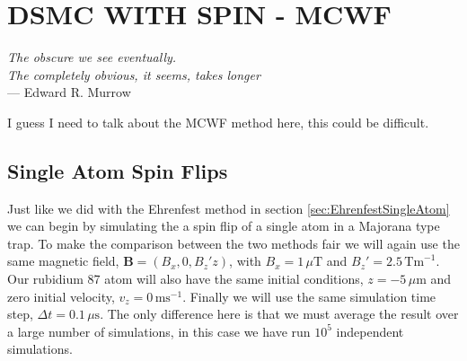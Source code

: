 
\chapter{DSMC WITH SPIN - MCWF} %

\label{ch:dsmcmcwf} %


\begin{flushright}{\slshape    
The obscure we see eventually. \\ 
The completely obvious, it seems, takes longer} \\ \medskip
--- Edward R. Murrow
\end{flushright}

\bigskip


I guess I need to talk about the MCWF method here, this could be difficult.

\section{Single Atom Spin Flips}

Just like we did with the Ehrenfest method in section \ref{sec:EhrenfestSingleAtom} we can begin by simulating the a spin flip of a single atom in a Majorana type trap. 
To make the comparison between the two methods fair we will again use the same magnetic field, $\mathbf{B} = (B_x,0,B_z'z)$, with $B_x=1\,\mu\mathrm{T}$ and $B_z'=2.5\,\mathrm{Tm}^{-1}$.
Our rubidium 87 atom will also have the same initial conditions, $z=-5\,\mu\mathrm{m}$ and zero initial velocity, $v_z=0\,\mathrm{ms}^{-1}$.
Finally we will use the same simulation time step, $\Delta t = 0.1\,\mu\mathrm{s}$.
The only difference here is that we must average the result over a large number of simulations, in this case we have run $10^5$ independent simulations.

